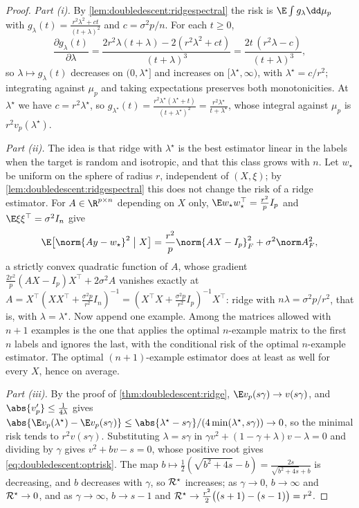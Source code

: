 \begin{refsection}
\begin{proof}
\emph{Part (i).} By \cref{lem:doubledescent:ridgespectral} the risk is $\E\int g_\lambda\dd\mu_p$ with $g_\lambda(t)=\frac{r^2\lambda^2+ct}{(t+\lambda)^2}$ and $c=\sigma^2p/n$. For each $t\ge0$,
\[
  \frac{\partial g_\lambda(t)}{\partial\lambda}=\frac{2r^2\lambda(t+\lambda)-2(r^2\lambda^2+ct)}{(t+\lambda)^3}=\frac{2t\,(r^2\lambda-c)}{(t+\lambda)^3},
\]
so $\lambda\mapsto g_\lambda(t)$ decreases on $(0,\lambda^\star]$ and increases on $[\lambda^\star,\infty)$, with $\lambda^\star=c/r^2$; integrating against $\mu_p$ and taking expectations preserves both monotonicities. At $\lambda^\star$ we have $c=r^2\lambda^\star$, so $g_{\lambda^\star}(t)=\frac{r^2\lambda^\star(\lambda^\star+t)}{(t+\lambda^\star)^2}=\frac{r^2\lambda^\star}{t+\lambda^\star}$, whose integral against $\mu_p$ is $r^2v_p(\lambda^\star)$.

\emph{Part (ii).} The idea is that ridge with $\lambda^\star$ is the best estimator linear in the labels when the target is random and isotropic, and that this class grows with $n$. Let $w_\star$ be uniform on the sphere of radius $r$, independent of $(X,\xi)$; by \cref{lem:doubledescent:ridgespectral} this does not change the risk of a ridge estimator. For $A\in\R^{p\times n}$ depending on $X$ only, $\E w_\star w_\star^\top=\frac{r^2}pI_p$ and $\E\xi\xi^\top=\sigma^2I_n$ give
\[
  \E\bigl[\norm{Ay-w_\star}^2\bigm| X\bigr]=\frac{r^2}p\norm{AX-I_p}_F^2+\sigma^2\norm A_F^2 ,
\]
a strictly convex quadratic function of $A$, whose gradient $\frac{2r^2}p(AX-I_p)X^\top+2\sigma^2A$ vanishes exactly at $A=X^\top(XX^\top+\frac{\sigma^2p}{r^2}I_n)^{-1}=(X^\top X+\frac{\sigma^2p}{r^2}I_p)^{-1}X^\top$: ridge with $n\lambda=\sigma^2p/r^2$, that is, with $\lambda=\lambda^\star$. Now append one example. Among the matrices allowed with $n+1$ examples is the one that applies the optimal $n$-example matrix to the first $n$ labels and ignores the last, with the conditional risk of the optimal $n$-example estimator. The optimal $(n+1)$-example estimator does at least as well for every $X$, hence on average.

\emph{Part (iii).} By the proof of \cref{thm:doubledescent:ridge}, $\E v_p(s\gamma)\to v(s\gamma)$, and $\abs{v_p'}\le\frac1{4\lambda}$ gives $\abs{\E v_p(\lambda^\star)-\E v_p(s\gamma)}\le\abs{\lambda^\star-s\gamma}/(4\min(\lambda^\star,s\gamma))\to0$, so the minimal risk tends to $r^2v(s\gamma)$. Substituting $\lambda=s\gamma$ in $\gamma v^2+(1-\gamma+\lambda)v-\lambda=0$ and dividing by $\gamma$ gives $v^2+bv-s=0$, whose positive root gives \eqref{eq:doubledescent:optrisk}. The map $b\mapsto\frac12(\sqrt{b^2+4s}-b)=\frac{2s}{\sqrt{b^2+4s}+b}$ is decreasing, and $b$ decreases with $\gamma$, so $\mathcal{R}^\star$ increases; as $\gamma\to0$, $b\to\infty$ and $\mathcal{R}^\star\to0$, and as $\gamma\to\infty$, $b\to s-1$ and $\mathcal{R}^\star\to\frac{r^2}2\bigl((s+1)-(s-1)\bigr)=r^2$.
\end{proof}


\end{refsection}
